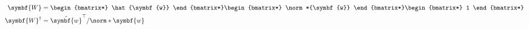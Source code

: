\documentclass{article}
\begin{document}
\begin{multicols*}{3}
\begin{itemize}
              \begin{align*}
                  \symbf{W}         & =
                                        \begin{bmatrix*}
                                            \hat{\symbf{w}}
                                        \end{bmatrix*}
                  \begin{bmatrix*}
                      \norm*{\symbf{w}}
                  \end{bmatrix*}
                  \begin{bmatrix*}
                      1
                  \end{bmatrix*}
                  \\
                  \symbf{W}^\dagger & = \hat{\symbf{w}}^\top / \norm*{\symbf{w}}
              \end{align*}
    \end{itemize}

\end{multicols*}
\end{document}
